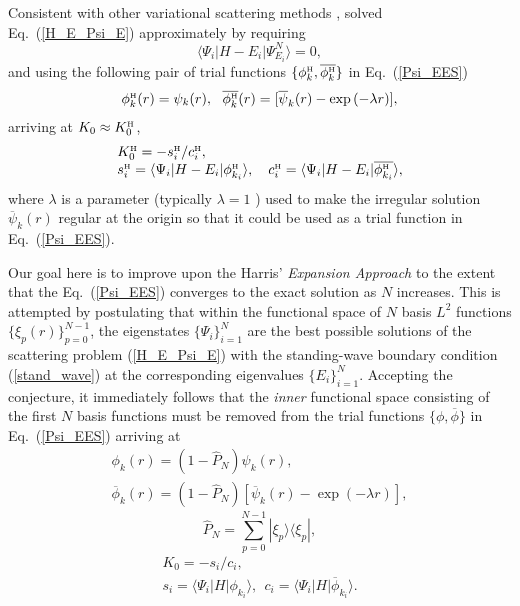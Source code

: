 \documentclass[aip
, pra
, showpacs
, aps
, twocolumn
, groupedaddress
, floatfix
]{revtex4}
\newcommand{\beq}{\begin{equation}}
\newcommand{\eeq}{\end{equation}}
\newcommand{\barr}{\begin{array}}
\newcommand{\earr}{\end{array}}
\newcommand{\phiH}{\phi^{\mbox{\tiny{H}}}}
\begin{document}
Consistent with other variational scattering methods \cite{Nesbet68},
\citet{Harris67} solved Eq.~(\ref{H_E_Psi_E}) approximately by requiring
\beq
\langle\Psi_i|H-E_i|\Psi^N_{E_i}\rangle=0,  \label{EES_ONE_C1}
\eeq
and using the following pair of trial functions $\{\phiH_k, \overline{\phiH_{k}} \}$ in
Eq.~(\ref{Psi_EES})
\beq \barr{l}
\phiH_k(r) =  \psi_k(r),\ \
\overline{\phiH_k}(r) =  [\overline{\psi}_k(r) - \exp{(-\lambda r)}],
\earr \label{def_phi_H} \eeq
arriving at $K_0\approx K^{\mbox{\tiny{H}}}_{0}$,
\beq \barr{l}
K^{\mbox{\tiny{H}}}_{0} = - s^{\mbox{\tiny{H}}}_i / c^{\mbox{\tiny{H}}}_i, \\
s^{\mbox{\tiny{H}}}_i = \langle\Psi_i|H-E_i|  \phiH_{k_i} \rangle, \ \ \
c^{\mbox{\tiny{H}}}_i = \langle\Psi_i|H-E_i|  \overline{\phiH_{k_i}} \rangle,
\earr \label{K_0_Harris} \eeq
where $\lambda$ is a parameter (typically $\lambda=1$ \cite{Nesbet68}) used to make the irregular solution $\overline{\psi}_k(r)$ regular
at the origin so that it could be used as a trial function in Eq.~(\ref{Psi_EES}).



Our goal here is to improve upon the Harris' {\em Expansion Approach} \cite{Harris67} to the extent that the Eq.~(\ref{Psi_EES})
converges to the exact solution as $N$ increases.
This is attempted by postulating that
within the functional space of $N$ basis $L^2$ functions  $\{\xi_p(r)\}_{p=0}^{N-1}$,
the eigenstates $\{\Psi_i\}_{i=1}^{N}$ are the best possible solutions of the scattering problem (\ref{H_E_Psi_E})
with the standing-wave boundary condition (\ref{stand_wave}) at the corresponding eigenvalues $\{E_i\}_{i=1}^{N}$.
Accepting the conjecture, it immediately follows that the {\em inner} functional space consisting of the first $N$ basis functions
must be removed from the trial functions $\{\phi,\overline{\phi}\}$ in Eq.~(\ref{Psi_EES}) arriving at
\beq \barr{l}
\phi_k(r) = (1-\hat{P}_N) \psi_k(r),\\
\overline{\phi}_k(r) = (1-\hat{P}_N) [\overline{\psi}_k(r) - \exp{(-\lambda r)}],
\earr \label{def_phi} \eeq
\beq
\hat{P}_N = \sum_{p=0}^{N-1} | \xi_p \rangle \langle \xi_p |,
\label{P_N} \eeq
\beq \barr{l}
K_{0} = - s_i / c_i, \\
s_i = \langle\Psi_i|H|  \phi_{k_i} \rangle, \ \
c_i =  \langle\Psi_i|H|  \overline{\phi}_{k_i} \rangle.
\earr \label{K_0_EES} \eeq
\end{document}
